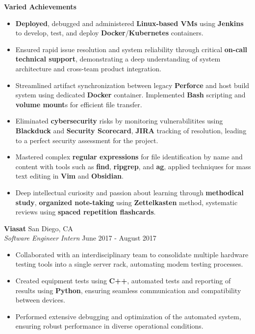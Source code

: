 \documentclass[a4paper]{article}
\newcommand{\forceindent}{\leavevmode{\parindent=1em\indent}}
\begin{document}
\vspace{-1mm}
\forceindent \textbf{Varied Achievements} \\
\vspace{-1mm}
\begin{itemize}
	\item \textbf{Deployed}, debugged and administered \textbf{Linux-based VMs} using \textbf{Jenkins} to develop, test, and deploy \textbf{Docker}/\textbf{Kubernetes} containers.
	\item Ensured rapid issue resolution and system reliability through critical \textbf{on-call technical support}, demonstrating a deep understanding of system architecture and cross-team product integration.
	\item Streamlined artifact synchronization between legacy \textbf{Perforce} and host build system using dedicated \textbf{Docker} container. Implemented \textbf{Bash} scripting and \textbf{volume mount}s for efficient file transfer.
	\item Eliminated \textbf{cybersecurity} risks by monitoring vulnerabilitites using \textbf{Blackduck} and \textbf{Security Scorecard}, \textbf{JIRA} tracking of resolution, leading to a perfect security assessment for the project.
	\item Mastered complex \textbf{regular expressions} for file identification by name and content with tools such as \textbf{find}, \textbf{ripgrep}, and \textbf{ag}, applied techniques for mass text editing in \textbf{Vim} and \textbf{Obsidian}.
	\item Deep intellectual curiosity and passion about learning through \textbf{methodical study}, \textbf{organized note-taking} using \textbf{Zettelkasten} method, systematic reviews using \textbf{spaced repetition flashcards}.
\end{itemize}

\vspace{-1mm}
\textbf{Viasat} \hfill San Diego, CA\\
\textit{Software Engineer Intern} \hfill June 2017 - August 2017\\
\vspace{-1mm}
\begin{itemize} \itemsep 1pt
    \item Collaborated with an interdisciplinary team to consolidate multiple hardware testing tools into a single server rack, automating modem testing processes.
    \item Created equipment tests using \textbf{C++}, automated tests and reporting of results using \textbf{Python}, ensuring seamless communication and compatibility between devices.
    \item Performed extensive debugging and optimization of the automated system, ensuring robust performance in diverse operational conditions.
\end{itemize}
\end{document}
